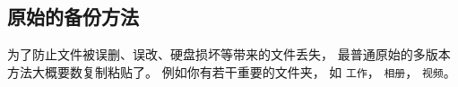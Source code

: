 
\subsection{原始的备份方法}
为了防止文件被误删、误改、硬盘损坏等带来的文件丢失， 最普通原始的多版本方法大概要数复制粘贴了。 例如你有若干重要的文件夹， 如 \verb|工作|， \verb|相册|， \verb|视频|。 
